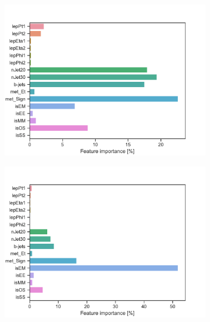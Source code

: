 \begin{figure}[H]
\begin{subfigure}[t!]{0.49\textwidth}
        \caption{}
        \label{fig:featSlepsnuLow}
    \end{subfigure}
    \begin{subfigure}[t!]{0.49\textwidth}
        \includegraphics[width = \textwidth]{Figures/WW/BDT/Low_level/Inter/featureImportance.pdf}
        \caption{}
        \label{fig:featWWLow}
    \end{subfigure}
    \begin{subfigure}[t!]{0.49\textwidth}
        \includegraphics[width = \textwidth]{Figures/Mono_Z/ML/BDT/Low_level/Inter/featureImportance.pdf}
        \caption{}
        \label{fig:featMonoZLow}
    \end{subfigure}
    \caption{}
    \label{fig:Non}
\end{figure}

